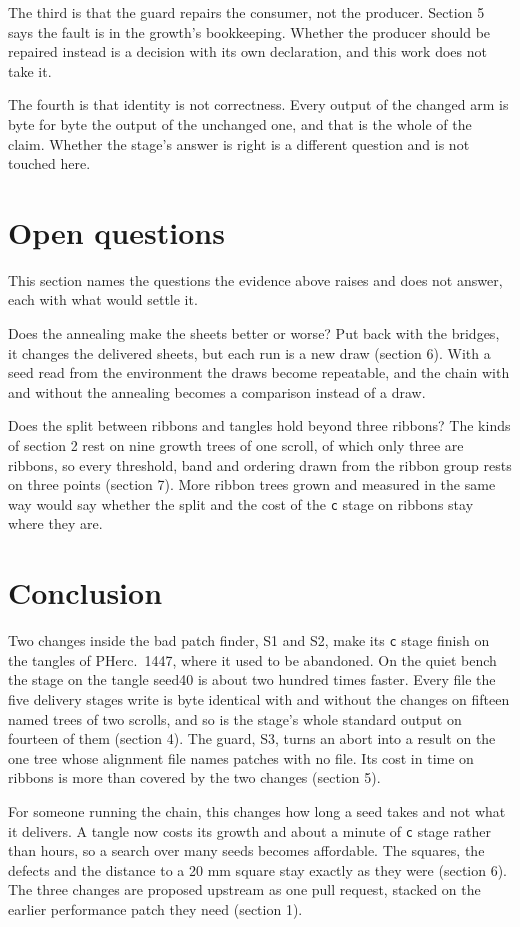 The third is that the guard repairs the consumer, not the producer. Section 5 says the fault is in the growth's bookkeeping. Whether the producer should be repaired instead is a decision with its own declaration, and this work does not take it.

The fourth is that identity is not correctness. Every output of the changed arm is byte for byte the output of the unchanged one, and that is the whole of the claim. Whether the stage's answer is right is a different question and is not touched here.

\section{Open questions}

This section names the questions the evidence above raises and does not answer, each with what would settle it.

Does the annealing make the sheets better or worse? Put back with the bridges, it changes the delivered sheets, but each run is a new draw (section 6). With a seed read from the environment the draws become repeatable, and the chain with and without the annealing becomes a comparison instead of a draw.

Does the split between ribbons and tangles hold beyond three ribbons? The kinds of section 2 rest on nine growth trees of one scroll, of which only three are ribbons, so every threshold, band and ordering drawn from the ribbon group rests on three points (section 7). More ribbon trees grown and measured in the same way would say whether the split and the cost of the \texttt{c} stage on ribbons stay where they are.

\section{Conclusion}

Two changes inside the bad patch finder, S1 and S2, make its \texttt{c} stage finish on the tangles of PHerc.~1447, where it used to be abandoned. On the quiet bench the stage on the tangle seed40 is about two hundred times faster. Every file the five delivery stages write is byte identical with and without the changes on fifteen named trees of two scrolls, and so is the stage's whole standard output on fourteen of them (section 4). The guard, S3, turns an abort into a result on the one tree whose alignment file names patches with no file. Its cost in time on ribbons is more than covered by the two changes (section 5).

For someone running the chain, this changes how long a seed takes and not what it delivers. A tangle now costs its growth and about a minute of \texttt{c} stage rather than hours, so a search over many seeds becomes affordable. The squares, the defects and the distance to a 20 mm square stay exactly as they were (section 6). The three changes are proposed upstream as one pull request, stacked on the earlier performance patch they need (section 1).

